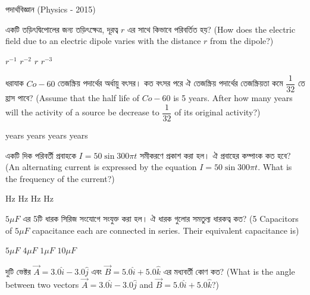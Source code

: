 \documentclass[addpoints]{exam}
\begin{document}
\begin{LARGE}
\begin{center}
পদার্থবিজ্ঞান (Physics - 2015)
\end{center}
\end{LARGE}
\begin{questions}

\question একটি তড়িৎদ্বিপোলের জন্য তড়িৎক্ষেত্র, দূরত্ব $ r $ এর সাথে কিভাবে পরিবর্তিত হয়? (How does the electric field due to an electric dipole varies with the distance $ r $ from the dipole?)

\begin{oneparchoices}
\choice $ r^{-1} $
\choice $ r^{-2} $
\choice $ r $
\choice $ r^{-3} $
\end{oneparchoices}

 \question  ধরাযাক $ Co-60 $ তেজস্ক্রিয় পদার্থের অর্ধায়ু বৎসর। কত বৎসর পরে ঐ তেজস্ক্রিয় পদার্থের তেজস্ক্রিয়তা কমে $ \dfrac{1}{32} $ তে হ্রাস পাবে? (Assume that the half life of $ Co-60 $ is 5 years. After how many years will the activity of a source be decrease to $ \dfrac{1}{32} $ of its original activity?)

\begin{oneparchoices}
 years
 years
 years
 years

\end{oneparchoices}

\question একটি দিক পরিবর্তী প্রবাহকে $ I = 50\sin 300 \pi t $ সমীকরণে প্রকাশ করা হল। ঐ প্রবাহের কম্পাংক কত হবে? (An alternating current is expressed by the equation $ I = 50\sin 300 \pi t $. What is the frequency of the current?)

\begin{oneparchoices}
 Hz
 Hz
 Hz
 Hz
\end{oneparchoices}

\question  $ 5\mu F $  এর 5টি ধারক সিরিজ সংযোগে সংযুক্ত করা হল। ঐ ধারক গুলোর সমতুল্য ধারকত্ব কত? (5 Capacitors of $ 5\mu F $ capacitance each are connected in series. Their equivalent capacitance is)

\begin{oneparchoices}
 \choice $ 5\mu F $ 
 \choice $ 4\mu F $ 
 \choice $ 1\mu F $ 
 \choice $ 10\mu F $ 
\end{oneparchoices}

\question  দুটি ভেক্টর $ \vec{A} = 3.0\hat{i}-3.0\hat{j} $ এবং $ \vec{B} = 5.0\hat{i}+5.0\hat{k} $ এর মধ্যবর্তী কোণ কত? (What is the angle between two vectors $ \vec{A} = 3.0\hat{i}-3.0\hat{j} $ and $ \vec{B} = 5.0\hat{i}+5.0\hat{k} $?)


\end{questions}
\end{document}
